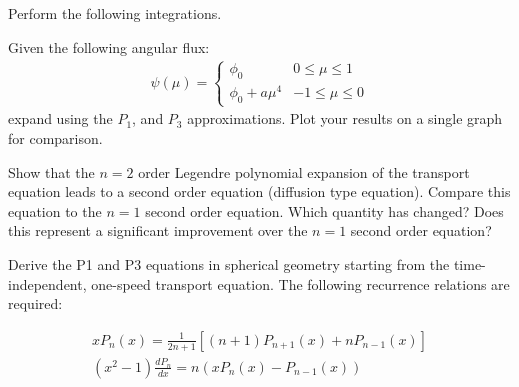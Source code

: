 \documentclass[12pts,answers,addpoints]{exam}
\begin{document}
\begin{questions}
        \question Perform the following integrations.

        \question[40] Given the following angular flux:
        \begin{align}
                        \psi(\mu) =
                \begin{cases}
                        \phi_0 & 0\le \mu \le 1\\
                        \phi_0  + a \mu^4 & -1\le \mu \le 0
                \end{cases}
        \end{align}
        expand using the $P_1$, and $P_3$ approximations. Plot your results on a single graph for
comparison.

        \question[20] Show that the $n=2$ order Legendre polynomial expansion of
        the transport equation leads to a second order equation (diffusion type
        equation). Compare this equation to the $n=1$ second order equation.
        Which quantity has changed? Does this represent a significant
        improvement over the $n=1$ second order equation?

        \question[20] Derive the P1 and P3 equations in spherical geometry starting from the time-independent, one-speed transport equation. The following recurrence relations are required:

        \begin{align}
                xP_n(x) = \frac{1}{2n+1}\left[(n+1)P_{n+1}(x) + n
                P_{n-1}(x)\right]\\
                (x^2 -1) \frac{dP_n}{dx} = n (xP_n(x)  - P_{n-1}(x))
        \end{align}
\end{questions}



%
%
\end{document}
